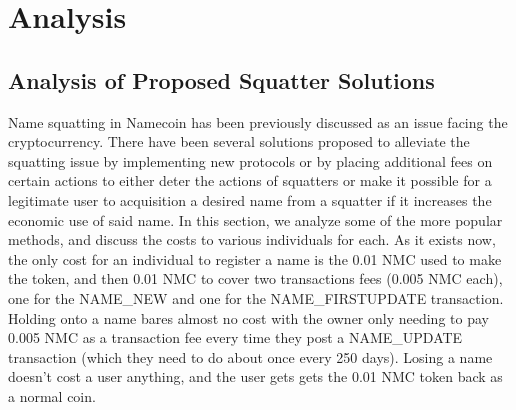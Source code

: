 \section{Analysis}
\label{sec:analysis}

\subsection{Analysis of Proposed Squatter Solutions}

    Name squatting in Namecoin has been previously discussed as an issue facing the cryptocurrency. There have been several solutions proposed to alleviate the squatting issue by implementing new protocols or by placing additional fees on certain actions to either deter the actions of squatters or make it possible for a legitimate user to acquisition a desired name from a squatter if it increases the economic use of said name. In this section, we analyze some of the more popular methods, and discuss the costs to various individuals for each. 
    As it exists now, the only cost for an individual to register a name is the 0.01 NMC used to make the token, and then 0.01 NMC to cover two transactions fees (0.005 NMC each), one for the NAME\_NEW and one for the NAME\_FIRSTUPDATE transaction. Holding onto a name bares almost no cost with the owner only needing to pay 0.005 NMC as a transaction fee every time they post a NAME\_UPDATE transaction (which they need to do about once every 250 days). Losing a name doesn't cost a user anything, and the user gets gets the 0.01 NMC token back as a normal coin. 

